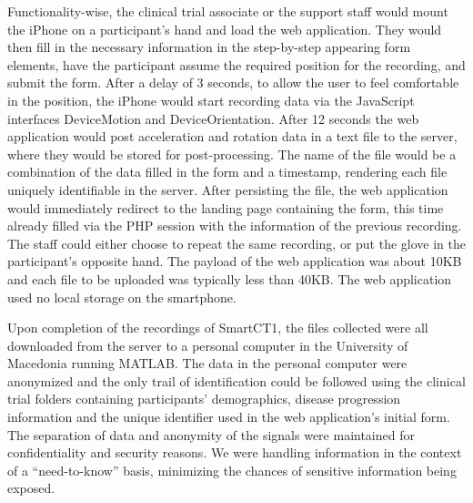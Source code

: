 Functionality-wise, the clinical trial associate or the support staff would mount the iPhone on a participant's hand and load the web application. They would then fill in the necessary information in the step-by-step appearing form elements, have the participant assume the required position for the recording, and submit the form. After a delay of 3 seconds, to allow the user to feel comfortable in the position, the iPhone would start recording data via the JavaScript interfaces DeviceMotion and DeviceOrientation. After 12 seconds the web application would post acceleration and rotation data in a text file to the server, where they would be stored for post-processing. The name of the file would be a combination of the data filled in the form and a timestamp, rendering each file uniquely identifiable in the server. After persisting the file, the web application would immediately redirect to the landing page containing the form, this time already filled via the PHP session with the information of the previous recording. The staff could either choose to repeat the same recording, or put the glove in the participant's opposite hand. The payload of the web application was about 10KB and each file to be uploaded was typically less than 40KB. The web application used no local storage on the smartphone. 

Upon completion of the recordings of \gls{SmartCT1}, the files collected were all downloaded from the server to a personal computer in the University of Macedonia running MATLAB. The data in the personal computer were anonymized and the only trail of identification could be followed using the clinical trial folders containing participants' demographics, disease progression information and the unique identifier used in the web application's initial form. The separation of data and anonymity of the signals were maintained for confidentiality and security reasons. We were handling information in the context of a ``need-to-know'' basis, minimizing the chances of sensitive information being exposed. 

